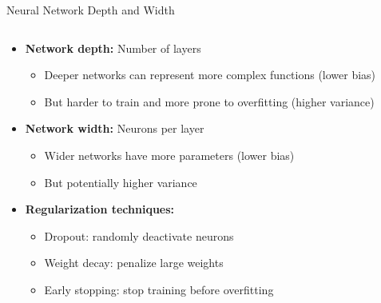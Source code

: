 \documentclass{beamer}
\begin{document}
\begin{frame}{Neural Network Depth and Width}
  \begin{columns}
    \begin{column}{0.6\textwidth}
      \begin{itemize}
        \item \textbf{Network depth:} Number of layers
        \begin{itemize}
          \item Deeper networks can represent more complex functions (lower bias)
          \item But harder to train and more prone to overfitting (higher variance)
        \end{itemize}
        
        \item \textbf{Network width:} Neurons per layer
        \begin{itemize}
          \item Wider networks have more parameters (lower bias)
          \item But potentially higher variance
        \end{itemize}
        
        \item \textbf{Regularization techniques:}
        \begin{itemize}
          \item Dropout: randomly deactivate neurons
          \item Weight decay: penalize large weights
          \item Early stopping: stop training before overfitting
        \end{itemize}
      \end{itemize}
    \end{column}
    
    \begin{column}{0.4\textwidth}
      \begin{center}
\end{center}
\end{column}
\end{columns}
\end{frame}
\end{document}
